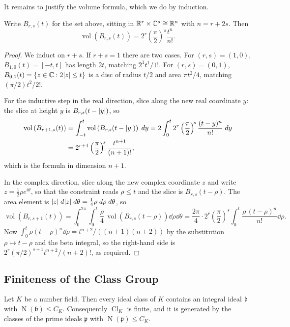 \documentclass[a4paper]{scrartcl}
\newcommand{\Nm}{\operatorname{N}}
\newcommand{\Cl}{\operatorname{Cl}}
\newcommand{\vol}{\operatorname{vol}}
\newcommand{\fb}{\mathfrak{b}}
\newcommand{\fp}{\mathfrak{p}}
\begin{document}
It remains to justify the volume formula, which we do by induction.

\begin{lemma}\label{lem:volB}
	Write $B_{r,s}(t)$ for the set above, sitting in $\mathbb{R}^r\times\mathbb{C}^s \cong \mathbb{R}^{n}$ with $n = r+2s$. Then
	$$\vol\left(B_{r,s}(t)\right) = 2^r\left(\frac{\pi}{2}\right)^{\!s}\frac{t^n}{n!}.$$
\end{lemma}

\begin{proof}
	We induct on $r+s$. If $r+s = 1$ there are two cases. For $(r,s) = (1,0)$, $B_{1,0}(t) = [-t,t]$ has length $2t$, matching $2^1t^1/1!$. For $(r,s) = (0,1)$, $B_{0,1}(t) = \{z \in \mathbb{C} : 2\lvert z\rvert \le t\}$ is a disc of radius $t/2$ and area $\pi t^2/4$, matching $(\pi/2)t^2/2!$.

	For the inductive step in the real direction, slice along the new real coordinate $y$: the slice at height $y$ is $B_{r,s}(t-\lvert y\rvert)$, so
	\begin{align*}
		\vol\left(B_{r+1,s}(t)\right) &= \int_{-t}^{t}\vol\left(B_{r,s}(t-\abs y)\right)\dd y = 2\int_0^t 2^r\left(\frac\pi2\right)^{\!s}\frac{(t-y)^{n}}{n!}\dd y\\
		&= 2^{r+1}\left(\frac\pi2\right)^{\!s}\frac{t^{n+1}}{(n+1)!},
	\end{align*}
	which is the formula in dimension $n+1$.

	In the complex direction, slice along the new complex coordinate $z$ and write $z = \tfrac12\rho e^{i\theta}$, so that the constraint reads $\rho \le t$ and the slice is $B_{r,s}(t-\rho)$. The area element is $\lvert z\rvert \; d\lvert z\rvert\; d\theta = \tfrac14\rho\; d\rho\; d\theta$, so
	$$\vol\left(B_{r,s+1}(t)\right) = \int_0^{2\pi}\!\!\int_0^t \frac{\rho}{4}\,\vol\left(B_{r,s}(t-\rho)\right)\dd\rho\dd\theta = \frac{2\pi}{4}\cdot2^r\left(\frac\pi2\right)^{\!s}\int_0^t\frac{\rho\,(t-\rho)^n}{n!}\dd\rho.$$
	Now $\int_0^t\rho(t-\rho)^n\dd\rho = t^{n+2}/((n+1)(n+2))$ by the substitution $\rho \mapsto t-\rho$ and the beta integral, so the right-hand side is $2^r(\pi/2)^{s+1}t^{n+2}/(n+2)!$, as required.
\end{proof}

\subsection{Finiteness of the Class Group}

\begin{theorem}\label{thm:finiteclass}
	Let $K$ be a number field. Then every ideal class of $K$ contains an integral ideal $\fb$ with $\Nm(\fb) \le C_K$. Consequently $\Cl_K$ is finite, and it is generated by the classes of the prime ideals $\fp$ with $\Nm(\fp) \le C_K$.
\end{theorem}
\end{document}
